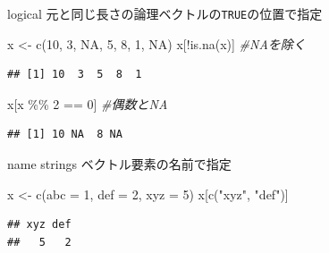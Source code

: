 \documentclass[
  ignorenonframetext,
]{beamer}
\newenvironment{Shaded}{\begin{snugshade}}{\end{snugshade}}
\newcommand{\AttributeTok}[1]{\textcolor[rgb]{0.77,0.63,0.00}{#1}}
\newcommand{\CommentTok}[1]{\textcolor[rgb]{0.56,0.35,0.01}{\textit{#1}}}
\newcommand{\ConstantTok}[1]{\textcolor[rgb]{0.00,0.00,0.00}{#1}}
\newcommand{\DecValTok}[1]{\textcolor[rgb]{0.00,0.00,0.81}{#1}}
\newcommand{\FunctionTok}[1]{\textcolor[rgb]{0.00,0.00,0.00}{#1}}
\newcommand{\NormalTok}[1]{#1}
\newcommand{\OtherTok}[1]{\textcolor[rgb]{0.56,0.35,0.01}{#1}}
\newcommand{\SpecialCharTok}[1]{\textcolor[rgb]{0.00,0.00,0.00}{#1}}
\newcommand{\StringTok}[1]{\textcolor[rgb]{0.31,0.60,0.02}{#1}}
\begin{document}
\begin{frame}[fragile]{logical}
\protect\hypertarget{logical-1}{}
元と同じ長さの論理ベクトルの\texttt{TRUE}の位置で指定

\begin{Shaded}
\begin{Highlighting}[]
\NormalTok{x }\OtherTok{\textless{}{-}} \FunctionTok{c}\NormalTok{(}\DecValTok{10}\NormalTok{, }\DecValTok{3}\NormalTok{, }\ConstantTok{NA}\NormalTok{, }\DecValTok{5}\NormalTok{, }\DecValTok{8}\NormalTok{, }\DecValTok{1}\NormalTok{, }\ConstantTok{NA}\NormalTok{)}
\NormalTok{x[}\SpecialCharTok{!}\FunctionTok{is.na}\NormalTok{(x)] }\CommentTok{\#NAを除く}
\end{Highlighting}
\end{Shaded}

\begin{verbatim}
## [1] 10  3  5  8  1
\end{verbatim}

\begin{Shaded}
\begin{Highlighting}[]
\NormalTok{x[x }\SpecialCharTok{\%\%} \DecValTok{2} \SpecialCharTok{==} \DecValTok{0}\NormalTok{] }\CommentTok{\#偶数とNA}
\end{Highlighting}
\end{Shaded}

\begin{verbatim}
## [1] 10 NA  8 NA
\end{verbatim}
\end{frame}

\begin{frame}[fragile]{name strings}
\protect\hypertarget{name-strings}{}
ベクトル要素の名前で指定

\begin{Shaded}
\begin{Highlighting}[]
\NormalTok{x }\OtherTok{\textless{}{-}} \FunctionTok{c}\NormalTok{(}\AttributeTok{abc =} \DecValTok{1}\NormalTok{, }\AttributeTok{def =} \DecValTok{2}\NormalTok{, }\AttributeTok{xyz =} \DecValTok{5}\NormalTok{)}
\NormalTok{x[}\FunctionTok{c}\NormalTok{(}\StringTok{"xyz"}\NormalTok{, }\StringTok{"def"}\NormalTok{)]}
\end{Highlighting}
\end{Shaded}

\begin{verbatim}
## xyz def 
##   5   2
\end{verbatim}
\end{frame}
\end{document}

